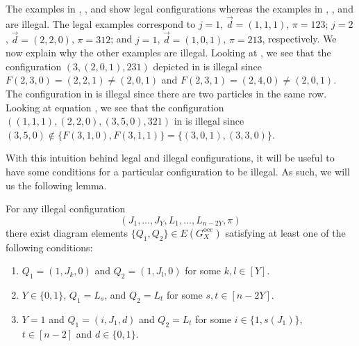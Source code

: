 \documentclass[../thesis-main/thesis-main]{subfiles}
\begin{document}
The examples in , , and  show legal configurations whereas the examples in , , and  are illegal.  The legal examples correspond to $j=1$, $\vec d=(1,1,1)$, $\pi = 123$; $j=2$, $\vec d=(2,2,0)$, $\pi = 312$; and $j=1$, $\vec d=(1,0,1)$, $\pi = 213$, respectively.  We now explain why the other examples are illegal. Looking at , we see that the configuration $(3,(2,0,1),231)$ depicted in  is illegal since $F(2,3,0)=(2,2,1) \neq (2,0,1)$ and $F(2,3,1)=(2,4,0) \neq (2,0,1)$. The configuration in  is illegal since there are two particles in the same row. Looking at equation , we see that the configuration $((1,1,1),(2,2,0),(3,5,0),321)$ in  is illegal since $(3,5,0)\notin \{F(3,1,0),F(3,1,1)\} = \{(3,0,1),(3,3,0)\}$.

With this intuition behind legal and illegal configurations, it will be useful to have some conditions for a particular configuration to be illegal.  As such, we will us the following lemma.

\begin{lemma}
\label{lem:legalconfig}
For any illegal configuration 
\begin{equation}
(J_{1},\ldots,J_{Y},L_{1},\ldots,L_{n-2Y},\pi)\label{eq:config1}
\end{equation}
there exist diagram elements $\{Q_{1},Q_{2}\}\in E(G_X^{\text{occ}})$ satisfying at least one of the following conditions:
\begin{enumerate}[label=(\roman*)]
\item $Q_{1}=(1,J_{k},0)$ and $Q_{2}=(1,J_{l},0)$ for some $k,l\in[Y]$.
\item $Y\in\{0,1\}$, $Q_{1}=L_{s}$, and $Q_{2}=L_{t}$ for some $s,t\in[n-2Y]$.
\item $Y=1$ and $Q_{1}=(i,J_{1},d)$ and $Q_{2}=L_{t}$ for some $i\in\{1,s(J_{1})\}$, $t\in[n-2]$ and $d\in\{0,1\}$.
\end{enumerate}
\end{lemma}
\end{document}
